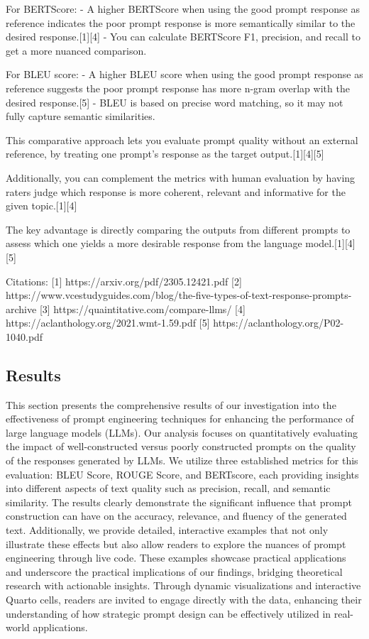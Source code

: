\documentclass[
]{agujournal2019}
\begin{document}
For BERTScore: - A higher BERTScore when using the good prompt response
as reference indicates the poor prompt response is more semantically
similar to the desired response.{[}1{]}{[}4{]} - You can calculate
BERTScore F1, precision, and recall to get a more nuanced comparison.

For BLEU score: - A higher BLEU score when using the good prompt
response as reference suggests the poor prompt response has more n-gram
overlap with the desired response.{[}5{]} - BLEU is based on precise
word matching, so it may not fully capture semantic similarities.

This comparative approach lets you evaluate prompt quality without an
external reference, by treating one prompt's response as the target
output.{[}1{]}{[}4{]}{[}5{]}

Additionally, you can complement the metrics with human evaluation by
having raters judge which response is more coherent, relevant and
informative for the given topic.{[}1{]}{[}4{]}

The key advantage is directly comparing the outputs from different
prompts to assess which one yields a more desirable response from the
language model.{[}1{]}{[}4{]}{[}5{]}

Citations: {[}1{]} https://arxiv.org/pdf/2305.12421.pdf {[}2{]}
https://www.vcestudyguides.com/blog/the-five-types-of-text-response-prompts-archive
{[}3{]} https://quaintitative.com/compare-llms/ {[}4{]}
https://aclanthology.org/2021.wmt-1.59.pdf {[}5{]}
https://aclanthology.org/P02-1040.pdf

\subsection{Results}\label{results}

This section presents the comprehensive results of our investigation
into the effectiveness of prompt engineering techniques for enhancing
the performance of large language models (LLMs). Our analysis focuses on
quantitatively evaluating the impact of well-constructed versus poorly
constructed prompts on the quality of the responses generated by LLMs.
We utilize three established metrics for this evaluation: BLEU Score,
ROUGE Score, and BERTscore, each providing insights into different
aspects of text quality such as precision, recall, and semantic
similarity. The results clearly demonstrate the significant influence
that prompt construction can have on the accuracy, relevance, and
fluency of the generated text. Additionally, we provide detailed,
interactive examples that not only illustrate these effects but also
allow readers to explore the nuances of prompt engineering through live
code. These examples showcase practical applications and underscore the
practical implications of our findings, bridging theoretical research
with actionable insights. Through dynamic visualizations and interactive
Quarto cells, readers are invited to engage directly with the data,
enhancing their understanding of how strategic prompt design can be
effectively utilized in real-world applications.
\end{document}
